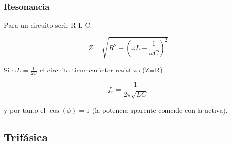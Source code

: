 \documentclass[serif, xcolor=dvipsnames]{beamer}
\begin{document}
\begin{frame}
  \frametitle{Resonancia}

  Para un circuito serie R-L-C:

\[
Z=\sqrt{R^{2}+\left(\omega L-\frac{1}{\omega C}\right)^{2}}
\]


Si $\omega L=\frac{1}{\omega C}$ el circuito tiene carácter resistivo
(Z=R).

\[
f_{r}=\frac{1}{2\pi\sqrt{LC}}
\]


y por tanto el $\cos(\phi)=1$ (la potencia aparente coincide con la
activa).


\end{frame}
\subsection{Trifásica}
\end{document}
